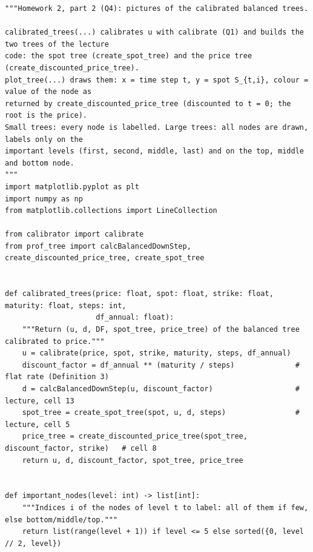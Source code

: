 \documentclass[11pt,a4paper]{article}
\begin{document}
\par\smallskip\noindent\begin{minipage}{\linewidth}\begin{lstlisting}[style=pysmall,title={new code (\texttt{tree\_plot.py})}]
"""Homework 2, part 2 (Q4): pictures of the calibrated balanced trees.

calibrated_trees(...) calibrates u with calibrate (Q1) and builds the two trees of the lecture
code: the spot tree (create_spot_tree) and the price tree (create_discounted_price_tree).
plot_tree(...) draws them: x = time step t, y = spot S_{t,i}, colour = value of the node as
returned by create_discounted_price_tree (discounted to t = 0; the root is the price).
Small trees: every node is labelled. Large trees: all nodes are drawn, labels only on the
important levels (first, second, middle, last) and on the top, middle and bottom node.
"""
import matplotlib.pyplot as plt
import numpy as np
from matplotlib.collections import LineCollection

from calibrator import calibrate
from prof_tree import calcBalancedDownStep, create_discounted_price_tree, create_spot_tree


def calibrated_trees(price: float, spot: float, strike: float, maturity: float, steps: int,
                     df_annual: float):
    """Return (u, d, DF, spot_tree, price_tree) of the balanced tree calibrated to price."""
    u = calibrate(price, spot, strike, maturity, steps, df_annual)
    discount_factor = df_annual ** (maturity / steps)              # flat rate (Definition 3)
    d = calcBalancedDownStep(u, discount_factor)                   # lecture, cell 13
    spot_tree = create_spot_tree(spot, u, d, steps)                # lecture, cell 5
    price_tree = create_discounted_price_tree(spot_tree, discount_factor, strike)   # cell 8
    return u, d, discount_factor, spot_tree, price_tree


def important_nodes(level: int) -> list[int]:
    """Indices i of the nodes of level t to label: all of them if few, else bottom/middle/top."""
    return list(range(level + 1)) if level <= 5 else sorted({0, level // 2, level})



\end{lstlisting}
\end{minipage}
\end{document}
